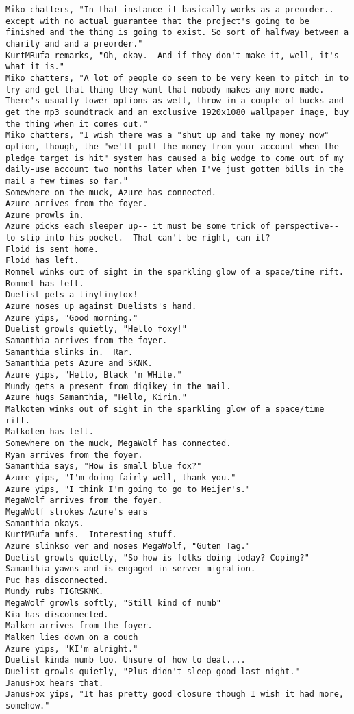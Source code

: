 \begin{verbatim}
Miko chatters, "In that instance it basically works as a preorder.. except with no actual guarantee that the project's going to be finished and the thing is going to exist. So sort of halfway between a charity and and a preorder."
KurtMRufa remarks, "Oh, okay.  And if they don't make it, well, it's what it is."
Miko chatters, "A lot of people do seem to be very keen to pitch in to try and get that thing they want that nobody makes any more made. There's usually lower options as well, throw in a couple of bucks and get the mp3 soundtrack and an exclusive 1920x1080 wallpaper image, buy the thing when it comes out."
Miko chatters, "I wish there was a "shut up and take my money now" option, though, the "we'll pull the money from your account when the pledge target is hit" system has caused a big wodge to come out of my daily-use account two months later when I've just gotten bills in the mail a few times so far."
Somewhere on the muck, Azure has connected.
Azure arrives from the foyer.
Azure prowls in.
Azure picks each sleeper up-- it must be some trick of perspective-- to slip into his pocket.  That can't be right, can it?
Floid is sent home.
Floid has left.
Rommel winks out of sight in the sparkling glow of a space/time rift.
Rommel has left.
Duelist pets a tinytinyfox!
Azure noses up against Duelists's hand.
Azure yips, "Good morning."
Duelist growls quietly, "Hello foxy!"
Samanthia arrives from the foyer.
Samanthia slinks in.  Rar.
Samanthia pets Azure and SKNK.
Azure yips, "Hello, Black 'n WHite."
Mundy gets a present from digikey in the mail.
Azure hugs Samanthia, "Hello, Kirin."
Malkoten winks out of sight in the sparkling glow of a space/time rift.
Malkoten has left.
Somewhere on the muck, MegaWolf has connected.
Ryan arrives from the foyer.
Samanthia says, "How is small blue fox?"
Azure yips, "I'm doing fairly well, thank you."
Azure yips, "I think I'm going to go to Meijer's."
MegaWolf arrives from the foyer.
MegaWolf strokes Azure's ears
Samanthia okays.
KurtMRufa mmfs.  Interesting stuff.
Azure slinkso ver and noses MegaWolf, "Guten Tag."
Duelist growls quietly, "So how is folks doing today? Coping?"
Samanthia yawns and is engaged in server migration.
Puc has disconnected.
Mundy rubs TIGRSKNK.
MegaWolf growls softly, "Still kind of numb"
Kia has disconnected.
Malken arrives from the foyer.
Malken lies down on a couch
Azure yips, "KI'm alright."
Duelist kinda numb too. Unsure of how to deal....
Duelist growls quietly, "Plus didn't sleep good last night."
JanusFox hears that.
JanusFox yips, "It has pretty good closure though I wish it had more, somehow."

\end{verbatim}
